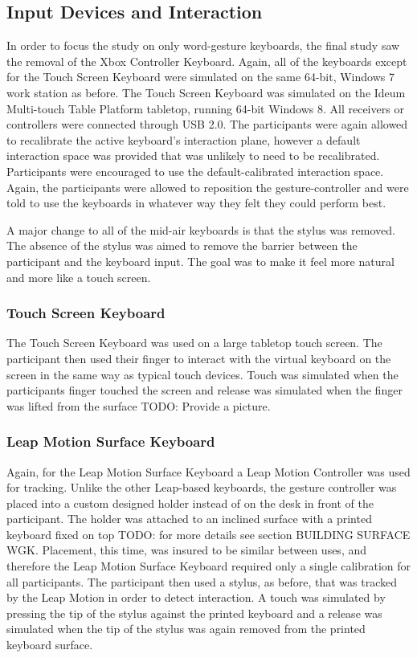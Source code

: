 \subsection{Input Devices and Interaction} \label{final_devices}
In order to focus the study on only word-gesture keyboards, the final study saw the removal of the Xbox Controller Keyboard. Again, all of the keyboards except for the Touch Screen Keyboard were simulated on the same 64-bit, Windows 7 work station as before. The Touch Screen Keyboard was simulated on the Ideum Multi-touch Table Platform tabletop, running 64-bit Windows 8. All receivers or controllers were connected through USB 2.0. The participants were again allowed  to recalibrate the active keyboard's interaction plane, however a default interaction space was provided that was unlikely to need to be recalibrated. Participants were encouraged to use the default-calibrated interaction space. Again, the participants were allowed to reposition the gesture-controller and were told to use the keyboards in whatever way they felt they could perform best.

A major change to all of the mid-air keyboards is that the stylus was removed. The absence of the stylus was aimed to remove the barrier between the participant and the keyboard input. The goal was to make it feel more natural and more like a touch screen.

\subsubsection{Touch Screen Keyboard}
The Touch Screen Keyboard was used on a large tabletop touch screen. The participant then used their finger to interact with the virtual keyboard on the screen in the same way as typical touch devices. Touch was simulated when the participants finger touched the screen and release was simulated when the finger was lifted from the surface TODO: Provide a picture.

\subsubsection{Leap Motion Surface Keyboard}
Again, for the Leap Motion Surface Keyboard a Leap Motion Controller was used for tracking. Unlike the other Leap-based keyboards, the gesture controller was placed into a custom designed holder instead of on the desk in front of the participant. The holder was attached to an inclined surface with a printed keyboard fixed on top TODO: for more details see section BUILDING SURFACE WGK. Placement, this time, was insured to be similar between uses, and therefore the Leap Motion Surface Keyboard required only a single calibration for all participants. The participant then used a stylus, as before, that was tracked by the Leap Motion in order to detect interaction. A touch was simulated by pressing the tip of the stylus against the printed keyboard and a release was simulated when the tip of the stylus was again removed from the printed keyboard surface.

